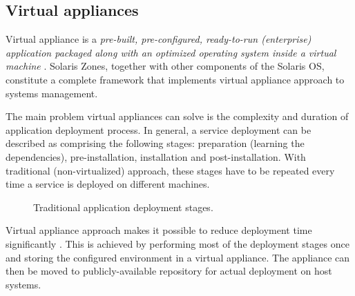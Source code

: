 \documentclass[11pt]{book}
\begin{document}
      \subsection{Virtual appliances}
      \label{sub:}

        Virtual appliance is a \textit{pre-built, pre-configured, ready-to-run (enterprise) application packaged along
        with an optimized operating system inside a virtual machine} \cite{changhua}. Solaris Zones, together with other
        components of the Solaris OS, constitute a complete framework that implements virtual appliance approach to
        systems management.

        The main problem virtual appliances can solve is the complexity and duration of application deployment process.
        In general, a service deployment can be described as comprising the following stages: preparation (learning the
        dependencies), pre-installation, installation and post-installation. With traditional (non-virtualized)
        approach, these stages have to be repeated every time a service is deployed on different machines.

        \begin{figure}[H]
          \begin{center}
          \end{center}

          \caption{Traditional application deployment stages.}
        \end{figure}


        Virtual appliance approach makes it possible to reduce deployment time significantly \cite{changhua}. This is
        achieved by performing most of the deployment stages once and storing the configured environment in a virtual
        appliance. The appliance can then be moved to publicly-available repository for actual deployment on host
        systems.
\end{document}
